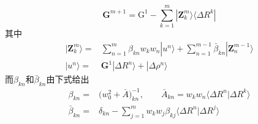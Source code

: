 {\begin{itemize}
\begin{displaymath}
		\mathbf{G}^{m+1}=\mathrm{G}^1-\sum_{k=1}^m|\mathbf{Z}_k^m\rangle\langle\Delta R^k|
	\end{displaymath}
	其中
	\begin{displaymath}
		\begin{aligned}
			|\mathbf{Z}_k^m\rangle=&\sum_{n=1}^m\beta_{kn}w_kw_n|u^n\rangle+\sum_{n=1}^{m-1}\bar{\beta}_{kn}|\mathbf{Z}_n^{m-1}\rangle\\
			|u^n\rangle=&\mathbf{G}^1|\Delta R^n\rangle+|\Delta \rho^n\rangle
		\end{aligned}
	\end{displaymath}
	而$\beta_{kn}$和$\bar\beta_{kn}$由下式给出
	\begin{displaymath}
		\begin{aligned}
			\beta_{kn}=&\big(w_0^2+\bar A\big)_{kn}^{-1},\qquad \bar A_{kn}=w_kw_n\langle\Delta R^n|\Delta R^k\rangle\\
			\bar\beta_{kn}=&\delta_{kn}-\sum_{j=1}^mw_kw_j\beta_{kj}\langle\Delta R^n|\Delta R^j\rangle
		\end{aligned}
	\end{displaymath}
		{\fontsize{7.2pt}{4.2pt}}
	\end{itemize}
}

